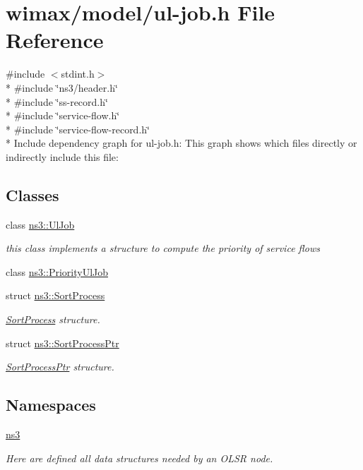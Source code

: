 \hypertarget{ul-job_8h}{}\section{wimax/model/ul-\/job.h File Reference}
\label{ul-job_8h}
{\ttfamily \#include $<$stdint.\+h$>$}\\*
{\ttfamily \#include \char`\"{}ns3/header.\+h\char`\"{}}\\*
{\ttfamily \#include \char`\"{}ss-\/record.\+h\char`\"{}}\\*
{\ttfamily \#include \char`\"{}service-\/flow.\+h\char`\"{}}\\*
{\ttfamily \#include \char`\"{}service-\/flow-\/record.\+h\char`\"{}}\\*
Include dependency graph for ul-\/job.h\+:
This graph shows which files directly or indirectly include this file\+:
\subsection*{Classes}
\begin{DoxyCompactItemize}
\item 
class \hyperlink{classns3_1_1UlJob}{ns3\+::\+Ul\+Job}
\begin{DoxyCompactList}\small\item\em this class implements a structure to compute the priority of service flows \end{DoxyCompactList}\item 
class \hyperlink{classns3_1_1PriorityUlJob}{ns3\+::\+Priority\+Ul\+Job}
\item 
struct \hyperlink{structns3_1_1SortProcess}{ns3\+::\+Sort\+Process}
\begin{DoxyCompactList}\small\item\em \hyperlink{structns3_1_1SortProcess}{Sort\+Process} structure. \end{DoxyCompactList}\item 
struct \hyperlink{structns3_1_1SortProcessPtr}{ns3\+::\+Sort\+Process\+Ptr}
\begin{DoxyCompactList}\small\item\em \hyperlink{structns3_1_1SortProcessPtr}{Sort\+Process\+Ptr} structure. \end{DoxyCompactList}\end{DoxyCompactItemize}
\subsection*{Namespaces}
\begin{DoxyCompactItemize}
\item 
 \hyperlink{namespacens3}{ns3}
\begin{DoxyCompactList}\small\item\em Here are defined all data structures needed by an O\+L\+SR node. \end{DoxyCompactList}\end{DoxyCompactItemize}
